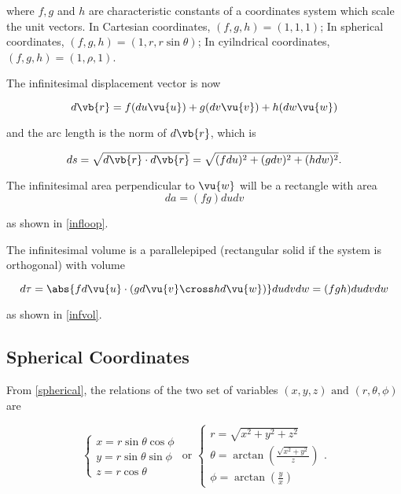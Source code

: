 \documentclass[english,a4paper,12pt]{report}
\begin{document}
where \(f,g\) and \(h\) are characteristic constants of a coordinates system which scale the unit vectors. In Cartesian coordinates, \((f,g,h) = (1,1,1)\); In spherical coordinates, \((f,g,h) = (1,r,r\sin{\theta})\); In cyilndrical coordinates, \((f,g,h) = (1,\rho ,1)\).
	
The infinitesimal displacement vector is now 

\begin{equation}
    d \vb{r} = f(du\vu{u}) + g(dv\vu{v}) + h(dw\vu{w}) \label{dl} 
\end{equation}

and the arc length is the norm of \(d \vb{r} \), which is 

\begin{equation}
    ds = \sqrt{d \vb{r} \cdot d \vb{r} } = \sqrt{(fdu)^2 + (gdv)^2 + (hdw)^2}.  
\end{equation}



The infinitesimal area perpendicular to \(\vu{w}\) will be a rectangle with area
\begin{equation}
	da = (fg)dudv \label{da}
\end{equation} 

as shown in \cref{infloop}.

	
The infinitesimal volume is a parallelepiped (rectangular solid if the system is orthogonal) with volume

\begin{equation}
    d \tau = \abs{fd \vu{u} \cdot (gd \vu{v} \cross hd \vu{w} )}dudvdw = (fgh)dudvdw 
\end{equation}

as shown in \cref{infvol}. 

	
\subsection{Spherical Coordinates}


From \cref{spherical}, the relations of the two set of variables \((x,y,z) \text { and } (r,\theta ,\phi  )\)  are

\begin{equation}
    \begin{cases} x = r\sin \theta \cos \phi \\ y = r\sin \theta \sin \phi \\ z = r\cos \theta \end{cases} \text { or } \begin{cases} r = \sqrt{x^2+y^2+z^2} \\ \theta = \arctan {\left(\frac{\sqrt{x^2+y^2} }{z} \right)} \\ \phi = \arctan {\left(\frac{y}{x}\right)} \end{cases}. 
\end{equation}
\end{document}
